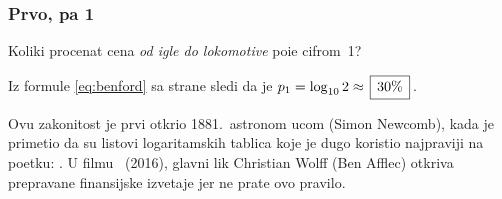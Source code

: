 \subsubsection{Prvo, pa 1}

\def\fibonacci#1#2#3{%
\newcount\o \o=#1
\newcount\t \t=#2
\number\o,~\number\t
\newcount\f
\newcount\n \n=#3 \advance\n-2
\loop
  \f=\t \advance\t\o \o=\f
  , \number\t
  \advance \n -1
\ifnum \n>0 \repeat}

\zadatak 
Koliki procenat cena {\sl od igle do lokomotive\/}
po{\cv}i{\nj}e cifrom~1?

\resenje Iz formule \eqref{eq:benford} sa strane \pageref{eq:benford} sledi da je $p_1=\logten 2 \approx \ram{30\%}$.

\dodatak Ovu zakonitost je prvi otkrio 1881.\ astronom {\Nj}ucom (Simon Newcomb), kada je primetio da su
listovi logaritamskih tablica koje je dugo koristio najpr{\lj}aviji
na po{\cv}etku: .
U filmu ~(2016), glavni lik Christian Wolff (Ben Afflec) otkriva preprav{\lj}ane finansijske izve{\sv}taje jer
ne prate ovo pravilo.